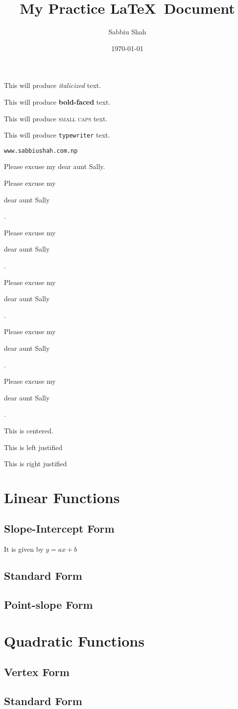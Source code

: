 \documentclass[11pt]{article}
\begin{document}
\tableofcontents

\title{My Practice \LaTeX\ Document}
\author{Sabbiu Shah}
\date{\today}
\maketitle

This will produce \textit{italicized} text.

This will produce \textbf{bold-faced} text.

This will produce \textsc{small caps} text.

This will produce \texttt{typewriter} text.

\texttt{www.sabbiushah.com.np}

Please excuse my dear aunt Sally.

Please excuse my \begin{large}dear aunt Sally\end{large}.

Please excuse my \begin{Large}dear aunt Sally\end{Large}.

Please excuse my \begin{huge} dear aunt Sally\end{huge}.

Please excuse my \begin{small} dear aunt Sally\end{small}.

Please excuse my \begin{tiny} dear aunt Sally\end{tiny}.

\begin{center}
This is centered.
\end{center}

\begin{flushleft}
This is left justified
\end{flushleft}

\begin{flushright}
This is right justified
\end{flushright}


\section{Linear Functions}
	\subsection{Slope-Intercept Form}
	It is given by $y=ax+b$
	\subsection{Standard Form}
	\subsection{Point-slope Form}
\section{Quadratic Functions}
	\subsection{Vertex Form}
	\subsection{Standard Form}
\end{document}
